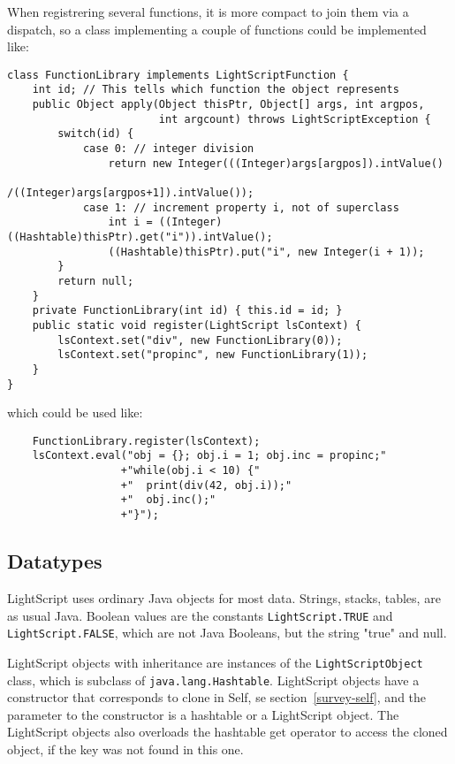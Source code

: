\documentclass[11pt]{report}
\begin{document}
When registrering several functions, it is more compact to join them via a dispatch, 
so a class implementing a couple of functions could be implemented like:
\begin{lstlisting}
class FunctionLibrary implements LightScriptFunction {
    int id; // This tells which function the object represents
    public Object apply(Object thisPtr, Object[] args, int argpos, 
                        int argcount) throws LightScriptException {
        switch(id) {
            case 0: // integer division
                return new Integer(((Integer)args[argpos]).intValue()
                                  /((Integer)args[argpos+1]).intValue());
            case 1: // increment property i, not of superclass
                int i = ((Integer)((Hashtable)thisPtr).get("i")).intValue();
                ((Hashtable)thisPtr).put("i", new Integer(i + 1));
        }
        return null;
    }
    private FunctionLibrary(int id) { this.id = id; }
    public static void register(LightScript lsContext) {
        lsContext.set("div", new FunctionLibrary(0));
        lsContext.set("propinc", new FunctionLibrary(1));
    }
}
\end{lstlisting}
which could be used like:
\begin{lstlisting}
    FunctionLibrary.register(lsContext);
    lsContext.eval("obj = {}; obj.i = 1; obj.inc = propinc;"
                  +"while(obj.i < 10) {"
                  +"  print(div(42, obj.i));"
                  +"  obj.inc();"
                  +"}");
\end{lstlisting}

\subsection{Datatypes}
LightScript uses ordinary Java objects for most data.
Strings, stacks, tables, are as usual Java.
Boolean values are the constants \verb|LightScript.TRUE| and \verb|LightScript.FALSE|, which are not Java Booleans, but the string "true" and null.

LightScript objects with inheritance are instances of the \verb|LightScriptObject| class, which is subclass of \verb|java.lang.Hashtable|. LightScript objects have a constructor that corresponds to clone in Self, se section~\ref{survey-self}, and the parameter to the constructor is a hashtable or a LightScript object. The LightScript objects also overloads the hashtable get operator to access the cloned object, if the key was not found in this one.
\end{document}

